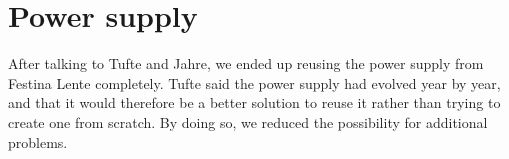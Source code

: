 \section {Power supply}

After talking to Tufte and Jahre, we ended up reusing the power supply
from Festina Lente completely. Tufte said the power supply had evolved year by
year, and that it would therefore be a better solution to reuse it rather
than trying to create one from scratch. By doing so, we reduced the possibility 
for additional problems.
